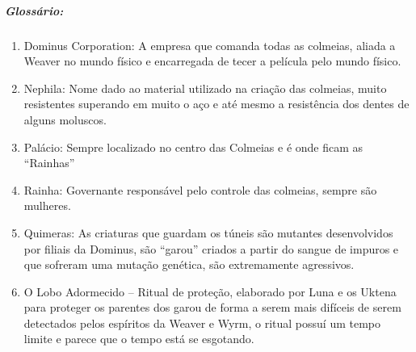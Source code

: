 \subparagraph{\bf Glossário:}
\begin{enumerate}
    \item {Dominus Corporation}: A empresa que comanda todas as colmeias, aliada a Weaver no mundo físico e encarregada de tecer a película pelo mundo físico.
    
    \item {Nephila}: Nome dado ao material utilizado na criação das colmeias, muito resistentes superando em muito o aço e até mesmo a resistência dos dentes de alguns moluscos.
    
    \item Palácio: Sempre localizado no centro das Colmeias e é onde ficam as “Rainhas”
    
    \item Rainha: Governante responsável pelo controle das colmeias, sempre são mulheres.
    
    \item Quimeras: As criaturas que guardam os túneis são mutantes desenvolvidos por filiais da Dominus, são “garou” criados a partir do sangue de impuros e que sofreram uma mutação genética, são extremamente agressivos.
    
    \item O Lobo Adormecido – Ritual de proteção, elaborado por Luna e os Uktena para proteger os parentes dos garou de forma a serem mais difíceis de serem detectados pelos espíritos da Weaver e Wyrm, o ritual possuí um tempo limite e parece que o tempo está se esgotando. 
\end{enumerate}